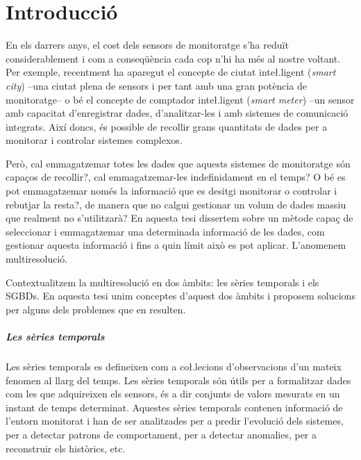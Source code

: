 

\chapter{Introducció}

En els darrers anys, el cost dels sensors de monitoratge s'ha reduït
considerablement i com a conseqüència cada cop n'hi ha més al nostre
voltant.  Per exemple, recentment ha aparegut el concepte de ciutat
inte\l.ligent (\emph{smart city}) --una ciutat plena de sensors i per
tant amb una gran potència de monitoratge-- o bé el concepte de
comptador inte\l.ligent (\emph{smart meter}) --un sensor amb capacitat
d'enregistrar dades, d'analitzar-les i amb sistemes de comunicació
integrats. Així doncs, és possible de recollir grans quantitats de
dades per a monitorar i controlar sistemes complexos. 

Però, cal emmagatzemar totes les dades que aquests sistemes de
monitoratge són capaços de recollir?, cal emmagatzemar-les
indefinidament en el temps? O bé es pot emmagatzemar només la
informació que es desitgi monitorar o controlar i rebutjar la resta?,
de manera que no calgui gestionar un volum de dades massiu que
realment no s'utilitzarà? En aquesta tesi dissertem sobre un mètode
capaç de seleccionar i emmagatzemar una determinada informació de les
dades, com gestionar aquesta informació i fins a quin límit això es pot
aplicar. L'anomenem multiresolució.


Contextualitzem la multiresolució en dos àmbits: les sèries temporals
i els \glspl{SGBD}. En aquesta tesi unim conceptes d'aquest dos àmbits
i proposem solucions per alguns dels problemes que en resulten.



\paragraph{Les sèries temporals}
Les sèries temporals es defineixen com a co\l.lecions d'observacions
d'un mateix fenomen al llarg del temps.  Les sèries temporals són
útils per a formalitzar dades com les que adquireixen els sensors, és
a dir conjunts de valors mesurats en un instant de temps
determinat. Aquestes sèries temporals contenen informació de l'entorn
monitorat i han de ser analitzades per a predir l'evolució dels
sistemes, per a detectar patrons de comportament, per a detectar
anomalies, per a reconstruir els històrics, etc.


